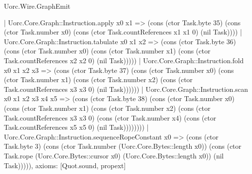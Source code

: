 \begin{lexlean}{Uorc.Wire.GraphEmit}
\begin{semanticmodule}
{    | Uorc.Core.Graph::Instruction.apply x0 x1 => (cons (ctor Task.byte 35) (cons (ctor Task.number x0) (cons (ctor Task.countReferences x1 x1 0) (nil Task))))
    | Uorc.Core.Graph::Instruction.tabulate x0 x1 x2 => (cons (ctor Task.byte 36) (cons (ctor Task.number x0) (cons (ctor Task.number x1) (cons (ctor Task.countReferences x2 x2 0) (nil Task)))))
    | Uorc.Core.Graph::Instruction.fold x0 x1 x2 x3 => (cons (ctor Task.byte 37) (cons (ctor Task.number x0) (cons (ctor Task.number x1) (cons (ctor Task.number x2) (cons (ctor Task.countReferences x3 x3 0) (nil Task))))))
    | Uorc.Core.Graph::Instruction.scan x0 x1 x2 x3 x4 x5 => (cons (ctor Task.byte 38) (cons (ctor Task.number x0) (cons (ctor Task.number x1) (cons (ctor Task.number x2) (cons (ctor Task.countReferences x3 x3 0) (cons (ctor Task.number x4) (cons (ctor Task.countReferences x5 x5 0) (nil Task))))))))
    | Uorc.Core.Graph::Instruction.sequenceRopeConstant x0 => (cons (ctor Task.byte 3) (cons (ctor Task.number (Uorc.Core.Bytes::length x0)) (cons (ctor Task.rope (Uorc.Core.Bytes::cursor x0) (Uorc.Core.Bytes::length x0)) (nil Task))))),
  axioms: [Quot.sound, propext]
}


\end{semanticmodule}
\end{lexlean}

